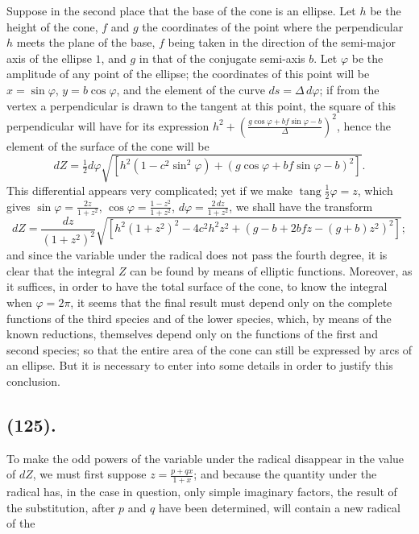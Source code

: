 \documentclass{article}
\begin{document}
Suppose in the second place that the base of the cone is an ellipse. Let $h$ be the height of the cone, $f$ and $g$ the coordinates of the point where the perpendicular $h$ meets the plane of the base, $f$ being taken in the direction of the semi-major axis of the ellipse $1$, and $g$ in that of the conjugate semi-axis $b$. Let $\varphi$ be the amplitude of any point of the ellipse; the coordinates of this point will be $x=\sin\varphi$, $y=b\cos\varphi$, and the element of the curve $ds=\Delta\,d\varphi$; if from the vertex a perpendicular is drawn to the tangent at this point, the square of this perpendicular will have for its expression $h^{2}+\left(\frac{g\cos\varphi+bf\sin\varphi-b}{\Delta}\right)^{2}$, hence the element of the surface of the cone will be
\[ dZ=\tfrac{1}{2}d\varphi\sqrt{[h^{2}(1-c^{2}\sin^{2}\varphi)+(g\cos\varphi+bf\sin\varphi-b)^{2}]}. \]
This differential appears very complicated; yet if we make $\operatorname{tang}\frac{1}{2}\varphi=z$, which gives $\sin\varphi=\frac{2z}{1+z^{2}}$, $\cos\varphi=\frac{1-z^{2}}{1+z^{2}}$, $d\varphi=\frac{2\,dz}{1+z^{2}}$, we shall have the transform
\[ dZ=\frac{dz}{(1+z^{2})^{2}}\sqrt{[h^{2}(1+z^{2})^{2}-4c^{2}h^{2}z^{2}+(g-b+2bfz-(g+b)z^{2})^{2}]}; \]
and since the variable under the radical does not pass the fourth degree, it is clear that the integral $Z$ can be found by means of elliptic functions. Moreover, as it suffices, in order to have the total surface of the cone, to know the integral when $\varphi=2\pi$, it seems that the final result must depend only on the complete functions of the third species and of the lower species, which, by means of the known reductions, themselves depend only on the functions of the first and second species; so that the entire area of the cone can still be expressed by arcs of an ellipse. But it is necessary to enter into some details in order to justify this conclusion.

\subsection*{(125).}

To make the odd powers of the variable under the radical disappear in the value of $dZ$, we must first suppose $z=\frac{p+qx}{1+x}$; and because the quantity under the radical has, in the case in question, only simple imaginary factors, the result of the substitution, after $p$ and $q$ have been determined, will contain a new radical of the
\end{document}
